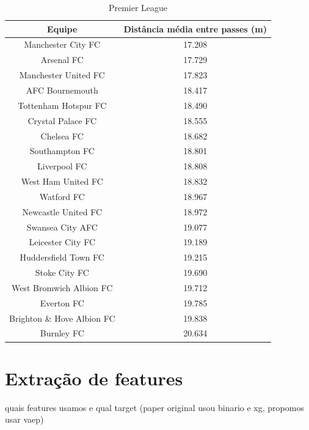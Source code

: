 \documentclass{article}
\begin{document}
\begin{table}[H]
	\centering
	\begin{tabular}{|c|c|}
		\hline
		\textbf{Equipe}            & \textbf{Distância média entre
			passes (m)}
		\\ \hline
		Manchester City FC         & 17.208
		\\ \hline
		Arsenal FC                 & 17.729
		\\ \hline
		Manchester United FC       & 17.823
		\\ \hline
		AFC Bournemouth            & 18.417
		\\ \hline
		Tottenham Hotspur FC       & 18.490
		\\ \hline
		Crystal Palace FC          & 18.555
		\\ \hline
		Chelsea FC                 & 18.682
		\\ \hline
		Southampton FC             & 18.801
		\\ \hline
		Liverpool FC               & 18.808
		\\ \hline
		West Ham United FC         & 18.832
		\\ \hline
		Watford FC                 & 18.967
		\\ \hline
		Newcastle United FC        & 18.972
		\\ \hline
		Swansea City AFC           & 19.077
		\\ \hline
		Leicester City FC          & 19.189
		\\ \hline
		Huddersfield Town FC       & 19.215
		\\ \hline
		Stoke City FC              & 19.690
		\\ \hline
		West Bromwich Albion FC    & 19.712
		\\ \hline
		Everton FC                 & 19.785
		\\ \hline
		Brighton \& Hove Albion FC & 19.838
		\\ \hline
		Burnley FC                 & 20.634
		\\ \hline
	\end{tabular}
	\caption{Premier League}
	\label{tab:average_distance_england}
\end{table}

\section{Extração de features}

quais features usamos e qual target (paper original usou binario e xg, propomos
usar vaep)
\end{document}
